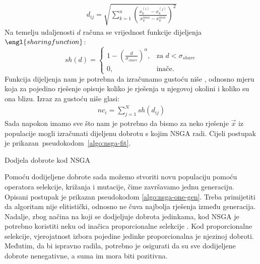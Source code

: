 \documentclass[times, utf8, zavrsni, numeric]{fer}
\begin{document}
\begin{align*}
d_{ij} = \sqrt{\sum_{k=1}^n\left(\frac{x_k^{(i)} - x_k^{(j)}}{x_k^{{max}} - x_k^{{min}}}\right)^2}
\end{align*}
Na temelju udaljenosti $d$ računa se vrijednost funkcije dijeljenja $\engl{sharing function}$:
\[
    sh(d)= 
\begin{cases}
    1 - \left(\frac{d}{\sigma_{share}}\right)^\alpha,& \text{za } d < \sigma_{share} \\
    0,              & \text{inače.}
\end{cases}
\]
Funkcija dijeljenja nam je potrebna da izračunamo gustoću niše , odnosno mjeru koja za pojedino rješenje opisuje koliko je rješenja u njegovoj okolini i koliko su ona blizu. Izraz za gustoću niše glasi:
\begin{align*}
nc_i = \sum_{j=1}^N sh(d_{ij})
\end{align*}
Sada napokon imamo sve što nam je potrebno da bismo za neko rješenje $\vec{x}$ iz populacije mogli izračunati dijeljenu dobrotu s kojim NSGA radi. Cijeli postupak je prikazan~pseudokodom~\ref{algo:nsga-fit}.\\

\begin{algorithm}
\caption{Dodjela dobrote kod NSGA}
\label{algo:nsga-fit}
\begin{algorithmic}
\ENDFOR
{}
\ENDFOR
\end{algorithmic}
\end{algorithm}

Pomoću dodijeljene dobrote sada možemo stvoriti novu populaciju pomoću operatora selekcije, križanja i mutacije, čime završavamo jednu generaciju. Opisani postupak je prikazan pseudokodom \ref{algo:nsga-one-gen}. Treba primijetiti da algoritam nije elitistički, odnosno ne čuva najbolja rješenja između generacija. Nadalje, zbog načina na koji se dodjeljuje dobrota jedinkama, kod NSGA je potrebno koristiti neku od inačica proporcionalne selekcije . Kod proporcionalne selekcije, vjerojatnost izbora pojedine jedinke proporcionalna je njezinoj dobroti. Međutim, da bi ispravno radila, potrebno je osigurati da su sve dodijeljene dobrote nenegativne, a suma im mora biti pozitivna.\\
\end{document}
